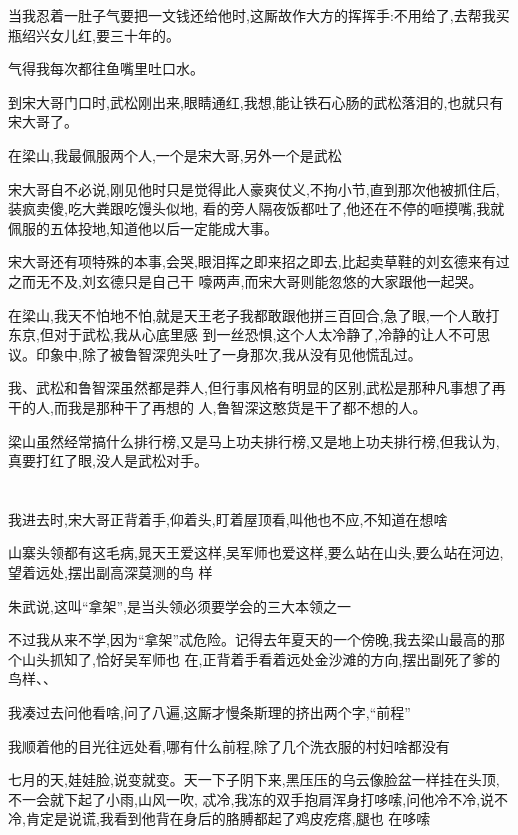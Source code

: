 ﻿\documentclass[12pt]{article}
\begin{document}
当我忍着一肚子气要把一文钱还给他时,这厮故作大方的挥挥手:不用给了,去帮我买瓶绍兴女儿红,要三十年的。

气得我每次都往鱼嘴里吐口水。

到宋大哥门口时,武松刚出来,眼睛通红,我想,能让铁石心肠的武松落泪的,也就只有宋大哥了。

在梁山,我最佩服两个人,一个是宋大哥,另外一个是武松

宋大哥自不必说,刚见他时只是觉得此人豪爽仗义,不拘小节,直到那次他被抓住后,装疯卖傻,吃大粪跟吃馒头似地,
看的旁人隔夜饭都吐了,他还在不停的咂摸嘴,我就佩服的五体投地,知道他以后一定能成大事。

宋大哥还有项特殊的本事,会哭,眼泪挥之即来招之即去,比起卖草鞋的刘玄德来有过之而无不及,刘玄德只是自己干
嚎两声,而宋大哥则能忽悠的大家跟他一起哭。

在梁山,我天不怕地不怕,就是天王老子我都敢跟他拼三百回合,急了眼,一个人敢打东京,但对于武松,我从心底里感
到一丝恐惧,这个人太冷静了,冷静的让人不可思议。印象中,除了被鲁智深兜头吐了一身那次,我从没有见他慌乱过。

我、武松和鲁智深虽然都是莽人,但行事风格有明显的区别,武松是那种凡事想了再干的人,而我是那种干了再想的
人,鲁智深这憨货是干了都不想的人。

梁山虽然经常搞什么排行榜,又是马上功夫排行榜,又是地上功夫排行榜,但我认为,真要打红了眼,没人是武松对手。

\section{}

我进去时,宋大哥正背着手,仰着头,盯着屋顶看,叫他也不应,不知道在想啥

山寨头领都有这毛病,晁天王爱这样,吴军师也爱这样,要么站在山头,要么站在河边,望着远处,摆出副高深莫测的鸟
样\dldots

朱武说,这叫``拿架'',是当头领必须要学会的三大本领之一

不过我从来不学,因为``拿架''忒危险。记得去年夏天的一个傍晚,我去梁山最高的那个山头抓知了,恰好吴军师也
在,正背着手看着远处金沙滩的方向,摆出副死了爹的鸟样、、

我凑过去问他看啥,问了八遍,这厮才慢条斯理的挤出两个字,``前程''

我顺着他的目光往远处看,哪有什么前程,除了几个洗衣服的村妇啥都没有

七月的天,娃娃脸,说变就变。天一下子阴下来,黑压压的乌云像脸盆一样挂在头顶,不一会就下起了小雨,山风一吹,
忒冷,我冻的双手抱肩浑身打哆嗦,问他冷不冷,说不冷,肯定是说谎,我看到他背在身后的胳膊都起了鸡皮疙瘩,腿也
在哆嗦
\end{document}
